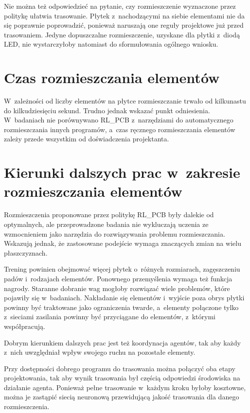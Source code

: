 Nie można też odpowiedzieć na pytanie, czy rozmieszczenie wyznaczone
przez politykę ułatwia trasowanie. Płytek z~nachodzącymi na siebie
elementami nie da się poprawnie poprowadzić, ponieważ naruszają one
reguły projektowe już przed trasowaniem. Jedyne dopuszczalne
rozmieszczenie, uzyskane dla płytki z~diodą LED, nie wystarczyłoby
natomiast do sformułowania ogólnego wniosku.

\section{Czas rozmieszczania elementów}

W~zależności od liczby elementów na płytce rozmieszczanie trwało od
kilkunastu do kilkudziesięciu sekund. Trudno jednak wskazać punkt
odniesienia. W~badaniach nie porównywano RL\_PCB z~narzędziami do
automatycznego rozmieszczania innych programów, a~czas ręcznego
rozmieszczania elementów zależy przede wszystkim od doświadczenia
projektanta.

\section{Kierunki dalszych prac w~zakresie rozmieszczania elementów}

Rozmieszczenia proponowane przez politykę RL\_PCB były dalekie od
optymalnych, ale przeprowadzone badania nie wykluczają uczenia ze
wzmocnieniem jako narzędzia do rozwiązywania problemu rozmieszczania.
Wskazują jednak, że zastosowane podejście wymaga znaczących zmian na
wielu płaszczyznach.

Trening powinien obejmować więcej płytek o~różnych rozmiarach,
zagęszczeniu padów i~rodzajach elementów. Ponownego przemyślenia wymaga
też funkcja nagrody. Staranne dobranie wag mogłoby rozwiązać wiele
problemów, które pojawiły się w~badaniach. Nakładanie się elementów
i~wyjście poza obrys płytki powinny być traktowane jako ograniczenia
twarde, a~elementy połączone tylko z~sieciami zasilania powinny być
przyciągane do elementów, z~którymi współpracują.

Dobrym kierunkiem dalszych prac jest też koordynacja agentów, tak aby
każdy z~nich uwzględniał wpływ swojego ruchu na pozostałe elementy.

Przy dostępności dobrego programu do trasowania można połączyć oba
etapy projektowania, tak aby wynik trasowania był częścią odpowiedzi
środowiska na działanie agenta. Ponieważ pełne trasowanie w~każdym
kroku byłoby kosztowne, można je zastąpić siecią neuronową
przewidującą jakość trasowania dla danego rozmieszczenia.

